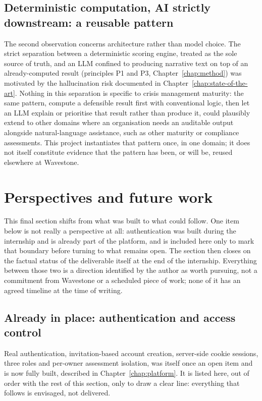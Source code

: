 \subsection{Deterministic computation, AI strictly downstream: a reusable pattern}
\label{sec:impact-technological-pattern}

The second observation concerns architecture rather than model choice. The strict separation between a deterministic scoring engine, treated as the sole source of truth, and an LLM confined to producing narrative text on top of an already-computed result (principles P1 and P3, Chapter~\ref{chap:method}) was motivated by the hallucination risk documented in Chapter~\ref{chap:state-of-the-art}. Nothing in this separation is specific to crisis management maturity: the same pattern, compute a defensible result first with conventional logic, then let an LLM explain or prioritise that result rather than produce it, could plausibly extend to other domains where an organisation needs an auditable output alongside natural-language assistance, such as other maturity or compliance assessments. This project instantiates that pattern once, in one domain; it does not itself constitute evidence that the pattern has been, or will be, reused elsewhere at Wavestone.

\section{Perspectives and future work}
\label{sec:impact-perspectives}

This final section shifts from what was built to what could follow. One item below is not really a perspective at all: authentication was built during the internship and is already part of the platform, and is included here only to mark that boundary before turning to what remains open. The section then closes on the factual status of the deliverable itself at the end of the internship. Everything between those two is a direction identified by the author as worth pursuing, not a commitment from Wavestone or a scheduled piece of work; none of it has an agreed timeline at the time of writing.

\subsection{Already in place: authentication and access control}
\label{sec:impact-perspectives-authentication}

Real authentication, invitation-based account creation, server-side cookie sessions, three roles and per-owner assessment isolation, was itself once an open item and is now fully built, described in Chapter~\ref{chap:platform}. It is listed here, out of order with the rest of this section, only to draw a clear line: everything that follows is envisaged, not delivered.

